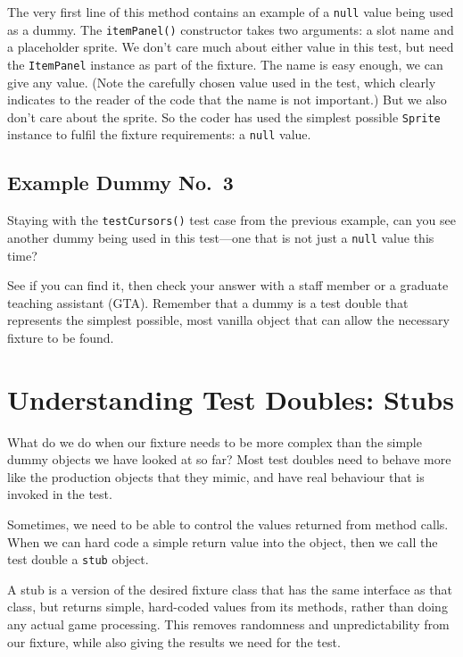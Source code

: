 \documentclass[
]{book}
\begin{document}
The very first line of this method contains an example of a \texttt{null} value being used as a dummy. The \texttt{itemPanel()} constructor takes two arguments: a slot name and a placeholder sprite. We don't care much about either value in this test, but need the \texttt{ItemPanel} instance as part of the fixture. The name is easy enough, we can give any value. (Note the carefully chosen value used in the test, which clearly indicates to the reader of the code that the name is not important.) But we also don't care about the sprite. So the coder has used the simplest possible \texttt{Sprite} instance to fulfil the fixture requirements: a \texttt{null} value.

\hypertarget{dummy3}{%
\subsection{Example Dummy No.~3}\label{dummy3}}

Staying with the \texttt{testCursors()} test case from the previous example, can you see another dummy being used in this test---one that is not just a \texttt{null} value this time?

See if you can find it, then check your answer with a staff member or a graduate teaching assistant (GTA). Remember that a dummy is a test double that represents the simplest possible, most vanilla object that can allow the necessary fixture to be found.

\hypertarget{stubs}{%
\section{Understanding Test Doubles: Stubs}\label{stubs}}

What do we do when our fixture needs to be more complex than the simple dummy objects we have looked at so far? Most test doubles need to behave more like the production objects that they mimic, and have real behaviour that is invoked in the test.

Sometimes, we need to be able to control the values returned from method calls. When we can hard code a simple return value into the object, then we call the test double a \texttt{stub} object.

A stub is a version of the desired fixture class that has the same interface as that class, but returns simple, hard-coded values from its methods, rather than doing any actual game processing. This removes randomness and unpredictability from our fixture, while also giving the results we need for the test.
\end{document}
